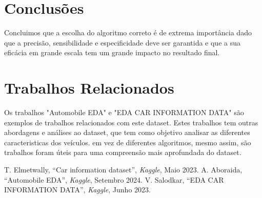 \documentclass[conference]{IEEEtran}
\begin{document}
\section{Conclusões}
Concluimos que a escolha do algoritmo correto é de extrema importância dado que a precisão, sensibilidade e especificidade
deve ser garantida e que a sua eficácia em grande escala tem um grande impacto no resultado final.

\section*{Trabalhos Relacionados}
Os trabalhos "Automobile EDA" \cite{ref2} e "EDA CAR INFORMATION DATA" \cite{ref3} são exemplos de trabalhos relacionados com este dataset.
Estes trabalhos tem outras abordagens e análises ao dataset, que tem como objetivo analisar as diferentes caracteristicas dos veículos.
 em vez de diferentes algoritmos, mesmo assim, são trabalhos foram úteis para uma compreensão mais aprofundada do dataset.



\begin{thebibliography}{1}
     T. Elmetwally, “Car information dataset”, \textit{Kaggle}, Maio 2023.
     A. Aboraida, “Automobile EDA”, \textit{Kaggle}, Setembro 2024.
     V. Salodkar, “EDA CAR INFORMATION DATA”, \textit{Kaggle}, Junho 2023.
\end{thebibliography}
\end{document}
